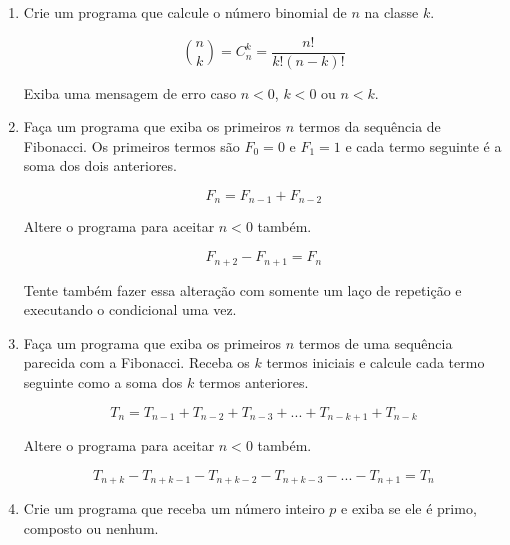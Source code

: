 \begin{enumerate}
	\begin{equation*}
		A^k_n = \frac{n!}{(n-k)!} = (n-k+1) (n-k+2) (n-k+3) .... n
	\end{equation*}

	\item Crie um programa que calcule o número binomial de $n$ na classe $k$.
	
	\begin{equation*}
		\binom{n}{k} = C^k_n = \frac{n!}{k!(n-k)!}
	\end{equation*} 
	
	Exiba uma mensagem de erro caso $n < 0$, $k < 0$ ou $n < k$.

\quebra 	

	\item Faça um programa que exiba os primeiros $n$ termos da sequência de Fibonacci. 
	Os primeiros termos são $F_0 = 0$ e $F_1 = 1$ e cada termo seguinte é a soma dos dois anteriores.
	
	\begin{equation*}
		F_n = F_{n-1} + F_{n-2}
	\end{equation*}
	
	Altere o programa para aceitar $n < 0$ também.
	
	\begin{equation*}
		F_{n+2} - F_{n+1} = F_n 
	\end{equation*}		
	
	Tente também fazer essa alteração com somente um laço de repetição e executando o condicional uma vez.
	
	\item Faça um programa que exiba os primeiros $n$ termos de uma sequência parecida com a Fibonacci.
	Receba os $k$ termos iniciais e calcule cada termo seguinte como a soma dos $k$ termos anteriores. 
	
	\begin{equation*}
		T_n = T_{n-1} + T_{n-2} + T_{n-3} + ... + T_{n-k+1} + T_{n-k}
	\end{equation*}
	
	Altere o programa para aceitar $n < 0$ também.
	
	\begin{equation*}
		T_{n+k} - T_{n+k-1} - T_{n+k-2} - T_{n+k-3} - ... - T_{n+1} = T_n 
	\end{equation*}		
	
	 
	\item Crie um programa que receba um número inteiro $p$ e exiba se ele é primo, composto ou nenhum.
	

\end{enumerate}
